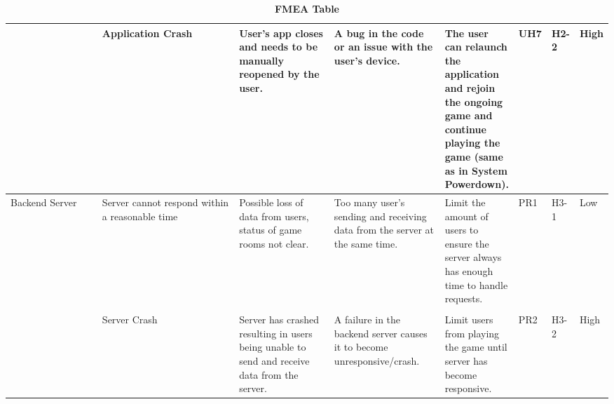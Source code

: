 \documentclass{article}
\begin{document}
\begin{table}[H]
\begin{adjustbox}{width=(/5)}
\begin{tabular}{|p{0.20\linewidth} | p{0.30\linewidth} | p{0.20\linewidth}|  p{0.20\linewidth}|  p{0.30\linewidth}|  p{0.07\linewidth}|  p{0.09\linewidth}|p{0.12\linewidth}| }
                                   &       Application Crash     &      User's app closes and needs to be manually reopened by the user.         &     A bug in the code or an issue with the user's device.     &     The user can relaunch the application and rejoin the ongoing game and continue playing the game (same as in System Powerdown).    &  UH7           &   H2-2          &   High               \\
          \hline
          Backend Server                   &    Server cannot respond within a reasonable time         &     Possible loss of data from users, status of game rooms not clear.    &    Too many user's sending and receiving data from the server at the same time.    &     Limit the amount of users to ensure the server always has enough time to handle requests.      &   PR1          &  H3-1            &      Low            \\&&&&&&&  \\
                                   &     Server Crash                   & Server has crashed resulting in users being unable to send and receive data from the server.                          &   A failure in the backend server causes it to become unresponsive/crash.                       &  Limit users from playing the game until server has become responsive.                               &  PR2           &  H3-2             &  High                 \\
          \hline
    \end{tabular}
    \end{adjustbox}
    \caption{\bf FMEA Table}
    \label{tab:FMEA1}
\end{table}
\end{document}
